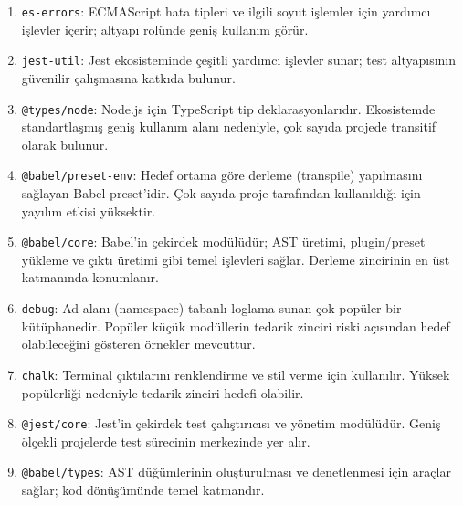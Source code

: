\documentclass[11pt,a4paper]{article}
\begin{document}
\begin{enumerate}
  \item \texttt{es-errors}: ECMAScript hata tipleri ve ilgili soyut işlemler için yardımcı işlevler içerir; altyapı rolünde geniş kullanım görür.
  \item \texttt{jest-util}: Jest ekosisteminde çeşitli yardımcı işlevler sunar; test altyapısının güvenilir çalışmasına katkıda bulunur.
  \item \texttt{@types/node}: Node.js için TypeScript tip deklarasyonlarıdır. Ekosistemde standartlaşmış geniş kullanım alanı nedeniyle, çok sayıda projede transitif olarak bulunur.
  \item \texttt{@babel/preset-env}: Hedef ortama göre derleme (transpile) yapılmasını sağlayan Babel preset’idir. Çok sayıda proje tarafından kullanıldığı için yayılım etkisi yüksektir.
  \item \texttt{@babel/core}: Babel’in çekirdek modülüdür; AST üretimi, plugin/preset yükleme ve çıktı üretimi gibi temel işlevleri sağlar. Derleme zincirinin en üst katmanında konumlanır.
  \item \texttt{debug}: Ad alanı (namespace) tabanlı loglama sunan çok popüler bir kütüphanedir. Popüler küçük modüllerin tedarik zinciri riski açısından hedef olabileceğini gösteren örnekler mevcuttur.
  \item \texttt{chalk}: Terminal çıktılarını renklendirme ve stil verme için kullanılır. Yüksek popülerliği nedeniyle tedarik zinciri hedefi olabilir.
  \item \texttt{@jest/core}: Jest’in çekirdek test çalıştırıcısı ve yönetim modülüdür. Geniş ölçekli projelerde test sürecinin merkezinde yer alır.
  \item \texttt{@babel/types}: AST düğümlerinin oluşturulması ve denetlenmesi için araçlar sağlar; kod dönüşümünde temel katmandır.
\end{enumerate}
\end{document}
